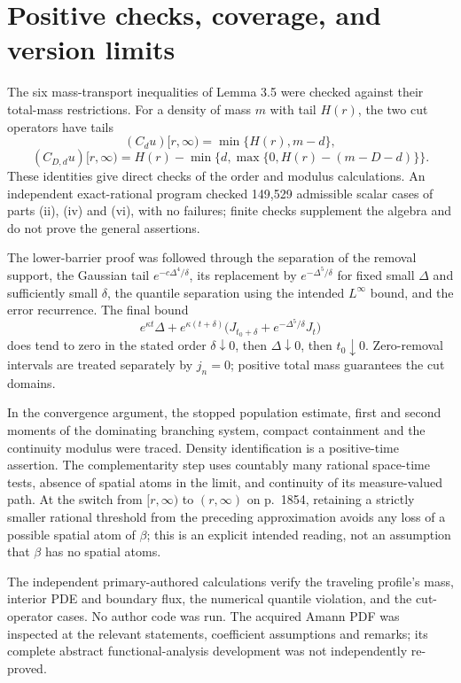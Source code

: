 \documentclass[10pt]{article}
\begin{document}
\section*{Positive checks, coverage, and version limits}
The six mass-transport inequalities of Lemma 3.5 were checked against their total-mass restrictions. For a density of mass \(m\) with tail \(H(r)\), the two cut operators have tails \[(C_d u)[r,\infty)=\min\{H(r),m-d\},\] \[(C_{D,d}u)[r,\infty)
=H(r)-\min\{d,\max\{0,H(r)-(m-D-d)\}\}.\] These identities give direct checks of the order and modulus calculations. An independent exact-rational program checked 149,529 admissible scalar cases of parts (ii), (iv) and (vi), with no failures; finite checks supplement the algebra and do not prove the general assertions.\par
The lower-barrier proof was followed through the separation of the removal support, the Gaussian tail \(e^{-c\Delta^4/\delta}\), its replacement by \(e^{-\Delta^5/\delta}\) for fixed small \(\Delta\) and sufficiently small \(\delta\), the quantile separation using the intended \(L^\infty\) bound, and the error recurrence. The final bound \[e^{\kappa t}\Delta+
e^{\kappa(t+\delta)}
\bigl(J_{t_0+\delta}+e^{-\Delta^5/\delta}J_t\bigr)\] does tend to zero in the stated order \(\delta\downarrow0\), then \(\Delta\downarrow0\), then \(t_0\downarrow0\). Zero-removal intervals are treated separately by \(j_n=0\); positive total mass guarantees the cut domains.\par
In the convergence argument, the stopped population estimate, first and second moments of the dominating branching system, compact containment and the continuity modulus were traced. Density identification is a positive-time assertion. The complementarity step uses countably many rational space-time tests, absence of spatial atoms in the limit, and continuity of its measure-valued path. At the switch from \([r,\infty)\) to \((r,\infty)\) on p. 1854, retaining a strictly smaller rational threshold from the preceding approximation avoids any loss of a possible spatial atom of \(\beta\); this is an explicit intended reading, not an assumption that \(\beta\) has no spatial atoms.\par
The independent primary-authored calculations verify the traveling profile’s mass, interior PDE and boundary flux, the numerical quantile violation, and the cut-operator cases. No author code was run. The acquired Amann PDF was inspected at the relevant statements, coefficient assumptions and remarks; its complete abstract functional-analysis development was not independently re-proved.\par
\end{document}
